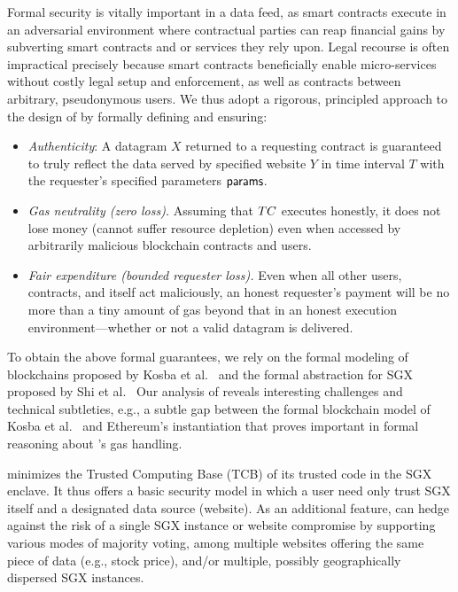 \vspace{2mm}
Formal security is vitally important in a data feed, as  smart contracts execute in an adversarial environment
where contractual parties can reap financial gains by subverting smart contracts and or services they rely upon.
Legal recourse is often impractical precisely because smart contracts beneficially enable micro-services without costly legal setup and enforcement, as well as contracts between arbitrary, pseudonymous users. We thus adopt a rigorous, principled approach to the design of \tcs by formally defining and ensuring: 

\vspace{-1mm}
\begin{itemize}[leftmargin=5mm]
\item
  \setlength{\itemsep}{2pt}
  \setlength{\parskip}{0pt}
  \setlength{\parsep}{0pt}
{\it Authenticity}: A datagram $X$ returned
to a requesting contract is guaranteed
to truly reflect the data served by specified website $Y$ in time interval $T$ with the requester's specified parameters ${\sf params}$.
\item
{\it Gas neutrality (zero \tc loss).} Assuming that $TC$ executes honestly, it does not lose money (cannot suffer resource depletion)
even when accessed by arbitrarily malicious blockchain contracts and users.
\item
{\it Fair expenditure (bounded requester loss).} 
Even when all other users, contracts, and \tc itself 
act maliciously, 
an honest requester's payment will be no more than a tiny amount of gas beyond that in an honest execution environment---whether or not a valid datagram is delivered.
\end{itemize}
\vspace{-1mm}

To obtain the above formal guarantees,
we rely on the formal modeling 
of blockchains proposed by Kosba et al.~\cite{hawk} and the formal abstraction for SGX proposed by Shi et al.~\cite{sgxsok}
Our analysis of \tc reveals interesting challenges and technical subtleties, e.g., 
a subtle gap between the formal blockchain model
of Kosba et al.~\cite{hawk}
and Ethereum's instantiation  
that proves important in formal reasoning about \tc's
gas handling. 

\vspace{2mm}
\tc minimizes the Trusted Computing Base (TCB) of its trusted code in the SGX enclave.
It thus offers a basic security model in which a user need only trust SGX itself and a designated data source (website).
As an additional feature, \tc can hedge against the risk of a single SGX instance
or website compromise by supporting
various modes of majority voting, 
among multiple 
websites offering the same piece of data (e.g., stock price),  
and/or multiple, possibly geographically dispersed SGX instances.

